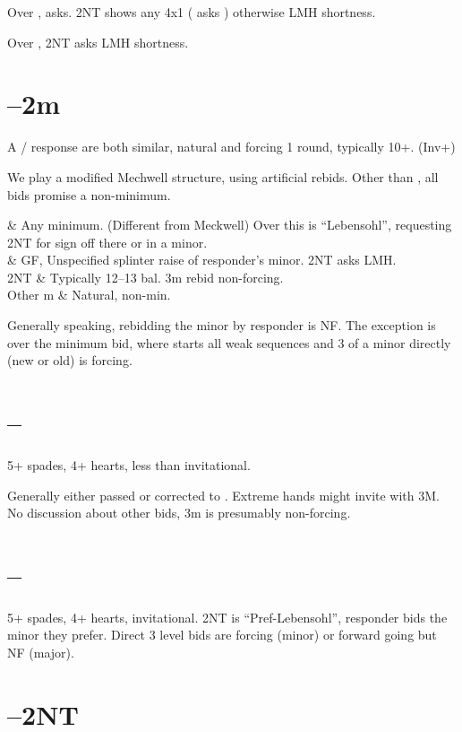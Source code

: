 \documentclass[tom-ari]{subfiles}
\begin{document}
Over ,  asks. 2NT shows any 4x1 ( asks \clubsuit\diamondsuit\heartsuit\spadesuit) otherwise LMH shortness.

Over , 2NT asks LMH shortness.

\section[1D--2m]{--2m}

A / response are both similar, natural and forcing 1 round, typically 10+. (Inv+)

We play a modified Mechwell structure, using artificial rebids. Other than , all bids promise a non-minimum.

\begin{bidtable}{}
	 & Any minimum. (Different from Meckwell) Over this  is ``Lebensohl'', requesting 2NT for sign off there or in a minor. \\
	 & GF, Unspecified splinter raise of responder's minor. 2NT asks LMH. \\
	2NT & Typically 12--13 bal. 3m rebid non-forcing. \\
	Other m &  Natural, non-min.
\end{bidtable}

Generally speaking, rebidding the minor by responder is NF. The exception is over the  minimum bid, where  starts all weak sequences and 3 of a minor directly (new or old) is forcing.

\section[1D--2H]{--}

5+ spades, 4+ hearts, less than invitational. 

Generally either passed or corrected to . Extreme hands might invite with 3M. No discussion about other bids, 3m is presumably non-forcing.

\section[1D--2S]{--}

5+ spades, 4+ hearts, invitational.  2NT is ``Pref-Lebensohl'', responder bids the minor they prefer. Direct 3 level bids are forcing (minor) or forward going but NF (major).

\section[1D--2NT]{--2NT}
\end{document}
